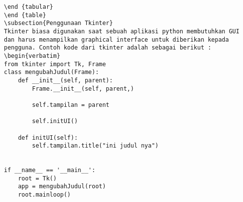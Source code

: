 \begin {verbatim}
\end {tabular}
\end {table}
\subsection{Penggunaan Tkinter}
Tkinter biasa digunakan saat sebuah aplikasi python membutuhkan GUI dan harus menampilkan graphical interface untuk diberikan kepada pengguna. Contoh kode dari tkinter adalah sebagai berikut : 
\begin{verbatim}
from tkinter import Tk, Frame
class mengubahJudul(Frame):
    def __init__(self, parent):
        Frame.__init__(self, parent,)

        self.tampilan = parent

        self.initUI()

    def initUI(self):
        self.tampilan.title("ini judul nya")


if __name__ == '__main__':
    root = Tk()
    app = mengubahJudul(root)
    root.mainloop()
\end{verbatim}